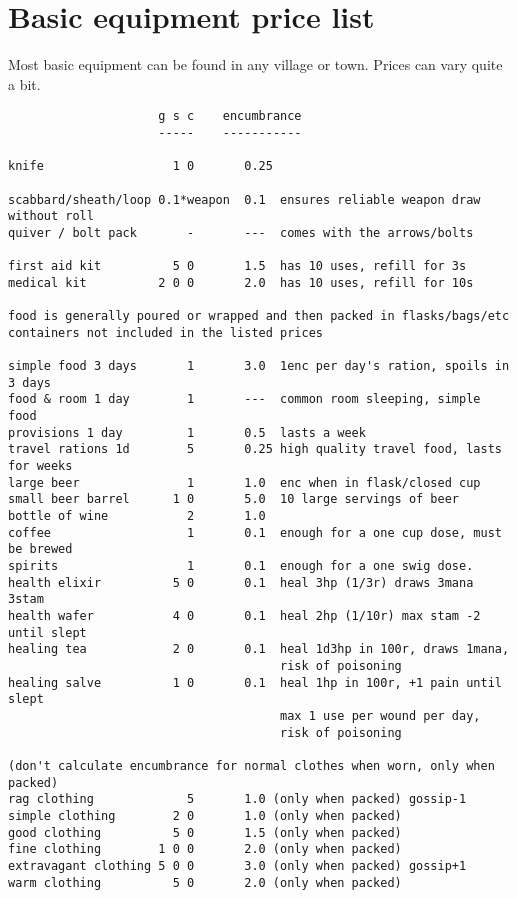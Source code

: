 
\goodbreak {}
\section*{Basic equipment price list}
\label{sec:basicequipmentpricelist}

Most basic equipment can be found in any village or town. Prices can vary quite a bit.


\small
\begin{verbatim}
                     g s c    encumbrance
                     -----    -----------

knife                  1 0       0.25

scabbard/sheath/loop 0.1*weapon  0.1  ensures reliable weapon draw without roll
quiver / bolt pack       -       ---  comes with the arrows/bolts

first aid kit          5 0       1.5  has 10 uses, refill for 3s
medical kit          2 0 0       2.0  has 10 uses, refill for 10s

food is generally poured or wrapped and then packed in flasks/bags/etc
containers not included in the listed prices

simple food 3 days       1       3.0  1enc per day's ration, spoils in 3 days
food & room 1 day        1       ---  common room sleeping, simple food
provisions 1 day         1       0.5  lasts a week
travel rations 1d        5       0.25 high quality travel food, lasts for weeks
large beer               1       1.0  enc when in flask/closed cup
small beer barrel      1 0       5.0  10 large servings of beer
bottle of wine           2       1.0
coffee                   1       0.1  enough for a one cup dose, must be brewed
spirits                  1       0.1  enough for a one swig dose.
health elixir          5 0       0.1  heal 3hp (1/3r) draws 3mana 3stam
health wafer           4 0       0.1  heal 2hp (1/10r) max stam -2 until slept
healing tea            2 0       0.1  heal 1d3hp in 100r, draws 1mana,
                                      risk of poisoning
healing salve          1 0       0.1  heal 1hp in 100r, +1 pain until slept
                                      max 1 use per wound per day,
                                      risk of poisoning

(don't calculate encumbrance for normal clothes when worn, only when packed)
rag clothing             5       1.0 (only when packed) gossip-1
simple clothing        2 0       1.0 (only when packed)
good clothing          5 0       1.5 (only when packed)
fine clothing        1 0 0       2.0 (only when packed)
extravagant clothing 5 0 0       3.0 (only when packed) gossip+1
warm clothing          5 0       2.0 (only when packed)


\end{verbatim}
